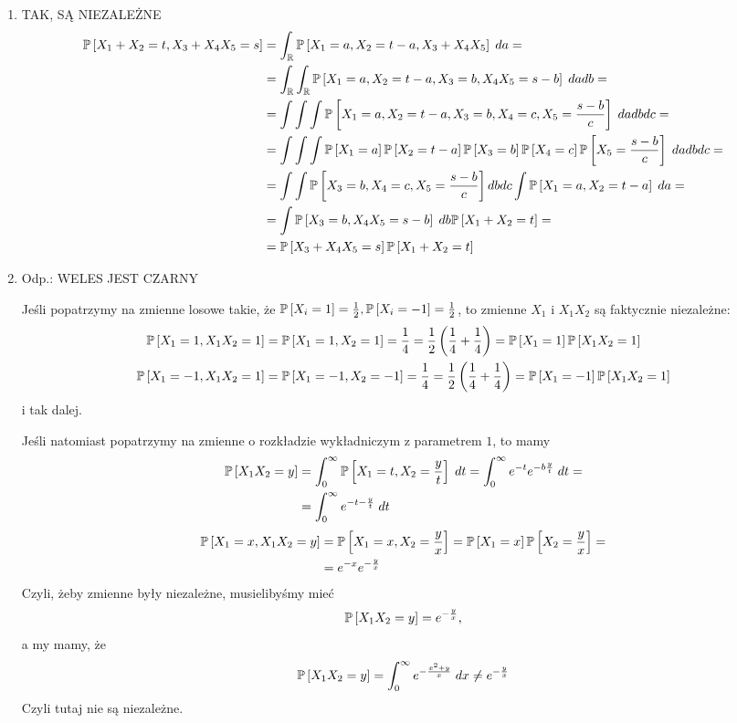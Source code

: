 \documentclass{article}
\begin{document}
\begin{enumerate}[label=(\alph*), leftmargin=*]
    \item TAK, SĄ NIEZALEŻNE
    \begin{align*}
        \prob{X_1+X_2=t,X_3+X_4X_5=s}&=\int_\R\prob{X_1=a,X_2=t-a,X_3+X_4X_5}\;da=\\
        &=\int_\R\int_\R\prob{X_1=a,X_2=t-a,X_3=b, X_4X_5=s-b}\;dadb=\\
        &=\int\int\int\prob{X_1=a,X_2=t-a,X_3=b,X_4=c,X_5=\frac{s-b}{c}}\;dadbdc=\\
        &=\int\int\int\prob{X_1=a}\prob{X_2=t-a}\prob{X_3=b}\prob{X_4=c}\prob{X_5=\frac{s-b}{c}}\;dadbdc=\\
        &=\int\int\prob{X_3=b,X_4=c,X_5=\frac{s-b}{c}}dbdc\int\prob{X_1=a,X_2=t-a}\;da=\\
        &=\int\prob{X_3=b,X_4X_5=s-b}\;db\prob{X_1+X_2=t}=\\
        &=\prob{X_3+X_4X_5=s}\prob{X_1+X_2=t}
    \end{align*}
    \item Odp.: WELES JEST CZARNY

    Jeśli popatrzymy na zmienne losowe takie, że $\prob{X_i=1}=\frac{1}{2},\prob{X_i=-1}=\frac{1}{2}$, to zmienne $X_1$ i $X_1X_2$ są faktycznie niezależne:
    \begin{align*}
        \prob{X_1=1,X_1X_2=1}&=\prob{X_1=1,X_2=1}=\frac{1}{4}=\frac{1}{2}\left(\frac{1}{4}+\frac{1}{4}\right)=\prob{X_1=1}\prob{X_1X_2=1}\\
        \prob{X_1=-1,X_1X_2=1}&=\prob{X_1=-1,X_2=-1}=\frac{1}{4}=\frac{1}{2}\left(\frac{1}{4}+\frac{1}{4}\right)=\prob{X_1=-1}\prob{X_1X_2=1}
    \end{align*}
    i tak dalej.

    Jeśli natomiast popatrzymy na zmienne o rozkładzie wykładniczym z parametrem $1$, to mamy
    \begin{align*}
        \prob{X_1X_2=y}&=\int_0^\infty\prob{X_1=t,X_2=\frac{y}{t}}\;dt=\int_0^\infty e^{-t}e^{-b\frac{y}{t}}\;dt=\\
        &=\int_0^\infty e^{-t-\frac{y}{t}}\;dt
    \end{align*}
    \begin{align*}
        \prob{X_1=x,X_1X_2=y}&=\prob{X_1=x,X_2=\frac{y}{x}}=\prob{X_1=x}\prob{X_2=\frac{y}{x}}=\\
        &=e^{-x}e^{-\frac{y}{x}}
    \end{align*}
    Czyli, żeby zmienne były niezależne, musielibyśmy mieć
    $$\prob{X_1X_2=y}=e^{-\frac{y}{x}},$$
    a my mamy, że
    $$\prob{X_1X_2=y}=\int_0^\infty e^{-\frac{x^2+y}{x}}\;dx\neq e^{-\frac{y}{x}}$$
    Czyli tutaj nie są niezależne.
\end{enumerate}
\end{document}
